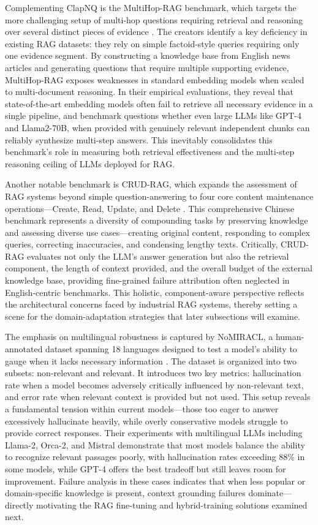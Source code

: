 \documentclass[11pt]{article}
\begin{document}
Complementing ClapNQ is the MultiHop-RAG benchmark, which targets the more challenging setup of multi-hop questions requiring retrieval and reasoning over several distinct pieces of evidence \cite{ref8}. The creators identify a key deficiency in existing RAG datasets: they rely on simple factoid-style queries requiring only one evidence segment. By constructing a knowledge base from English news articles and generating questions that require multiple supporting evidence, MultiHop-RAG exposes weaknesses in standard embedding models when scaled to multi-document reasoning. In their empirical evaluations, they reveal that state-of-the-art embedding models often fail to retrieve all necessary evidence in a single pipeline, and benchmark questions whether even large LLMs like GPT-4 and Llama2-70B, when provided with genuinely relevant independent chunks can reliably synthesize multi-step answers. This inevitably consolidates this benchmark's role in measuring both retrieval effectiveness and the multi-step reasoning ceiling of LLMs deployed for RAG.

Another notable benchmark is CRUD-RAG, which expands the assessment of RAG systems beyond simple question-answering to four core content maintenance operations---Create, Read, Update, and Delete \cite{ref51}. This comprehensive Chinese benchmark represents a diversity of compounding tasks by preserving knowledge and assessing diverse use cases---creating original content, responding to complex queries, correcting inaccuracies, and condensing lengthy texts. Critically, CRUD-RAG evaluates not only the LLM's answer generation but also the retrieval component, the length of context provided, and the overall budget of the external knowledge base, providing fine-grained failure attribution often neglected in English-centric benchmarks. This holistic, component-aware perspective reflects the architectural concerns faced by industrial RAG systems, thereby setting a scene for the domain-adaptation strategies that later subsections will examine.

The emphasis on multilingual robustness is captured by NoMIRACL, a human-annotated dataset spanning 18 languages designed to test a model's ability to gauge when it lacks necessary information \cite{ref125}. The dataset is organized into two subsets: non-relevant and relevant. It introduces two key metrics: hallucination rate when a model becomes adversely critically influenced by non-relevant text, and error rate when relevant context is provided but not used. This setup reveals a fundamental tension within current models---those too eager to answer excessively hallucinate heavily, while overly conservative models struggle to provide correct responses. Their experiments with multilingual LLMs including Llama-2, Orca-2, and Mistral demonstrate that most models balance the ability to recognize relevant passages poorly, with hallucination rates exceeding 88\% in some models, while GPT-4 offers the best tradeoff but still leaves room for improvement. Failure analysis in these cases indicates that when less popular or domain-specific knowledge is present, context grounding failures dominate---directly motivating the RAG fine-tuning and hybrid-training solutions examined next.
\end{document}
